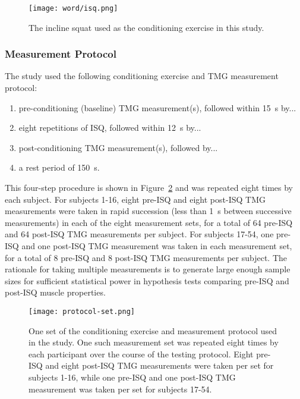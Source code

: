 \documentclass[utf8]{FrontiersinHarvard}
\begin{document}
\begin{figure}
	\centering
    \texttt{[image: word/isq.png]}
    \caption{The incline squat used as the conditioning exercise in this study.}
    \label{fig:isq}
\end{figure}

\subsubsection{Measurement Protocol} \label{sss:measurement_protocol}
The study used the following conditioning exercise and TMG measurement protocol:
\begin{enumerate}

    \item pre-conditioning (baseline) TMG measurement(s), followed within \SI{15}{\second} by...

    \item eight repetitions of ISQ, followed within \SI{12}{\second} by...

    \item post-conditioning TMG measurement(s), followed by...

    \item a rest period of \SI{150}{\second}.

\end{enumerate}
This four-step procedure is shown in Figure~\ref{fig:protocol} and was repeated eight times by each subject.
For subjects 1-16, eight pre-ISQ and eight post-ISQ TMG measurements were taken in rapid succession (less than \SI{1}{\second} between successive measurements) in each of the eight measurement sets, for a total of 64 pre-ISQ and 64 post-ISQ TMG measurements per subject.
For subjects 17-54, one pre-ISQ and one post-ISQ TMG measurement was taken in each measurement set, for a total of 8 pre-ISQ and 8 post-ISQ TMG measurements per subject.
The rationale for taking multiple measurements is to generate large enough sample sizes for sufficient statistical power in hypothesis tests comparing pre-ISQ and post-ISQ muscle properties.

\begin{figure}
	\centering
    \texttt{[image: protocol-set.png]}
    \caption{One set of the conditioning exercise and measurement protocol used in the study.
    One such measurement set was repeated eight times by each participant over the course of the testing protocol.
    Eight pre-ISQ and eight post-ISQ TMG measurements were taken per set for subjects 1-16, while one pre-ISQ and one post-ISQ TMG measurement was taken per set for subjects 17-54.}
    \label{fig:protocol}
\end{figure}
\end{document}
